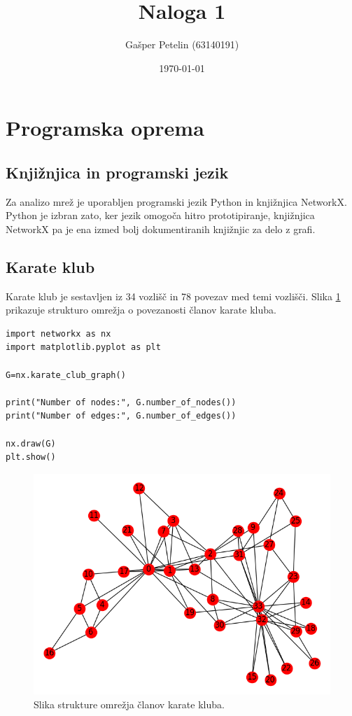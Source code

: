 \documentclass[a4paper,11pt]{article}
\title{Naloga 1}
\author{Gašper Petelin (63140191)}
\date{\today}
\begin{document}
\maketitle


\section{Programska oprema}

\subsection{Knjižnjica in programski jezik}

Za analizo mrež je uporabljen programski jezik Python in knjižnjica NetworkX. Python je izbran zato, ker jezik omogoča hitro prototipiranje, knjižnjica NetworkX pa je ena izmed bolj dokumentiranih knjižnjic za delo z grafi.

\subsection{Karate klub}

Karate klub je sestavljen iz 34 vozlišč in 78 povezav med temi vozlišči. Slika \ref{slika1} prikazuje strukturo omrežja o povezanosti članov karate kluba. 

\begin{lstlisting}
import networkx as nx
import matplotlib.pyplot as plt

G=nx.karate_club_graph()

print("Number of nodes:", G.number_of_nodes())
print("Number of edges:", G.number_of_edges())

nx.draw(G)
plt.show()
\end{lstlisting}

\begin{figure}[htbp]
\begin{center}
\includegraphics[scale=0.4]{karate.png}
\caption{Slika strukture omrežja članov karate kluba.}
\label{slika1}
\end{center}
\end{figure}
\end{document}
